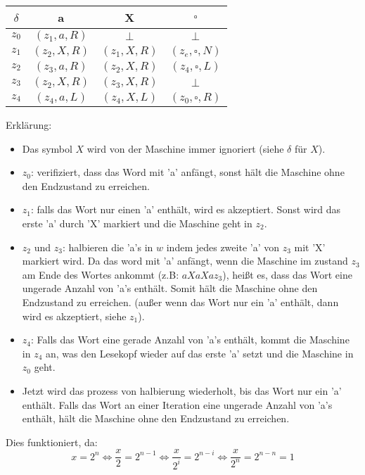 \documentclass[a4paper,onecolumn,oneside,12pt,ngerman]{article}
\theoremstyle{plain} %
\theoremstyle{definition} %
\theoremstyle{remark} %
\theoremstyle{plain}
\begin{document}
\begin{center}
	\begin{tabular}{c|ccc}
	$\delta$ & a & X & $\square$ \\ \hline
	$z_0$ & $(z_1, a, R)$ & $\bot$ & $\bot$ \\
	$z_1$ & $(z_2, X, R)$ & $(z_1, X, R)$ & $(z_e, \square, N)$ \\
	$z_2$ & $(z_3, a, R)$ &$(z_2,X,R)$ & $(z_4, \square, L)$ \\
	$z_3$ & $(z_2, X, R)$ & $(z_3,X,R)$ & $\bot$ \\
	$z_4$ & $(z_4, a, L)$ & $(z_4, X, L)$ & $(z_0, \square, R)$ \\
	\end{tabular}
\end{center}

Erklärung:

\begin{itemize}
	\item Das symbol $X$ wird von der Maschine immer ignoriert (siehe $\delta$ für $X$).
	\item $z_0$: verifiziert, dass das Word mit 'a' anfängt, 
	sonst hält die Maschine ohne den Endzustand zu erreichen.
	\item $z_1$: falls das Wort nur einen 'a' enthält, wird es akzeptiert. 
	Sonst wird das erste 'a' durch 'X' markiert und die Maschine geht in $z_2$.
	\item $z_2$ und $z_3$: halbieren die 'a's in $w$ indem jedes zweite 'a' von $z_3$
	mit 'X' markiert wird. Da das word mit 'a' anfängt, wenn die Maschine im zustand $z_3$
	am Ende des Wortes ankommt (z.B: $aXaXaz_3$), heißt es, dass das Wort eine ungerade 
	Anzahl von 'a's enthält. Somit hält die Maschine ohne den Endzustand zu erreichen.
	(außer wenn das Wort nur ein 'a' enthält, dann wird es akzeptiert, siehe $z_1$).
	\item $z_4$: Falls das Wort eine gerade Anzahl von 'a's enthält, kommt die Maschine
	in $z_4$ an, was den Lesekopf wieder auf das erste 'a' setzt und die Maschine in $z_0$ geht.
	\item Jetzt wird das prozess von halbierung wiederholt, bis das Wort nur ein 'a' enthält.
	Falls das Wort an einer Iteration eine ungerade Anzahl von 'a's enthält, hält die Maschine ohne den Endzustand zu erreichen.
\end{itemize}
Dies funktioniert, da:
\[x = 2^n \Leftrightarrow \frac{x}{2} = 2^{n-1} \Leftrightarrow \frac{x}{2^i} = 2^{n-i} \Leftrightarrow \frac{x}{2^n} = 2^{n-n} = 1\]
\end{document}
